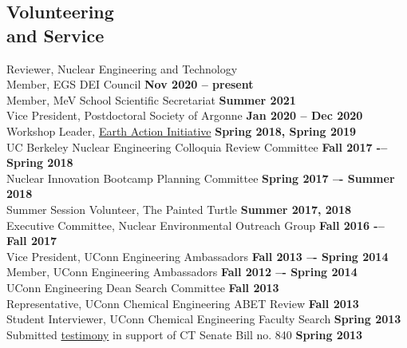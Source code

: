 \documentclass[margin,line]{resume}
\begin{document}
\begin{resume}
\section{\mysidestyle Volunteering\\and Service}
Reviewer, Nuclear Engineering and Technology \\
Member, EGS DEI Council
    \hfill \textbf{Nov 2020 -- present} \\
Member, MeV School Scientific Secretariat
    \hfill \textbf{Summer 2021} \\
Vice President, Postdoctoral Society of Argonne
    \hfill \textbf{Jan 2020 -- Dec 2020} \\
Workshop Leader, \href{https://www.earthactioninitiative.org/}{Earth Action Initiative}
    \hfill \textbf{Spring 2018, Spring 2019} \\
UC Berkeley Nuclear Engineering Colloquia Review Committee 
    \hfill \textbf{Fall 2017 -– Spring 2018} \\
Nuclear Innovation Bootcamp Planning Committee	
    \hfill \textbf{Spring 2017 –- Summer 2018} \\
Summer Session Volunteer, The Painted Turtle
    \hfill \textbf{Summer 2017, 2018} \\
Executive Committee, Nuclear Environmental Outreach Group
    \hfill \textbf{Fall 2016 -– Fall 2017} \\
Vice President, UConn Engineering Ambassadors
    \hfill \textbf{Fall 2013 –- Spring 2014} \\
Member, UConn Engineering Ambassadors
    \hfill \textbf{Fall 2012 –- Spring 2014} \\
UConn Engineering Dean Search Committee
    \hfill \textbf{Fall 2013} \\
Representative, UConn Chemical Engineering ABET Review
    \hfill \textbf{Fall 2013} \\
Student Interviewer, UConn Chemical Engineering Faculty Search
    \hfill \textbf{Spring 2013} \\
Submitted \href{https://www.cga.ct.gov/2013/FINdata/Tmy/2013SB-00840-R000304-Milos\%20Atz,\%20Student,\%20UConn-TMY.PDF}{testimony} in support of CT Senate Bill no. 840
    \hfill \textbf{Spring 2013} \\ %




\end{resume}
\end{document}
